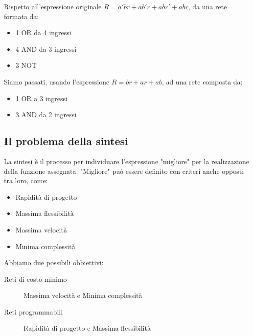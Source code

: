 \documentclass{subfiles}
\begin{document}
\noindent
Rispetto all'espressione originale $R = a'br + ab'r + abr' + abr$, da una rete formata da:

\begin{itemize}
    \item 1 OR da 4 ingressi
    \item 4 AND da 3 ingressi
    \item 3 NOT
\end{itemize}

\noindent
Siamo passati, usando l'espressione $R = br + ar + ab$, ad una rete composta da:

\begin{itemize}
    \item 1 OR a 3 ingressi
    \item 3 AND da 2 ingressi
\end{itemize}

\subsection{Il problema della sintesi}

La sintesi è il processo per individuare l'espressione "migliore" per la realizzazione della funzione assegnata.
"Migliore" può essere definito con criteri anche opposti tra loro, come:

\begin{itemize}
    \item Rapidità di progetto
    \item Massima flessibilità
    \item Massima velocità
    \item Minima complessità
\end{itemize}

\noindent
Abbiamo due possibili obbiettivi:

\begin{description}
	\item[Reti di costo minimo] Massima velocità e Minima complessità
	\item[Reti programmabili] Rapidità di progetto e Massima flessibilità
\end{description}
\end{document}
